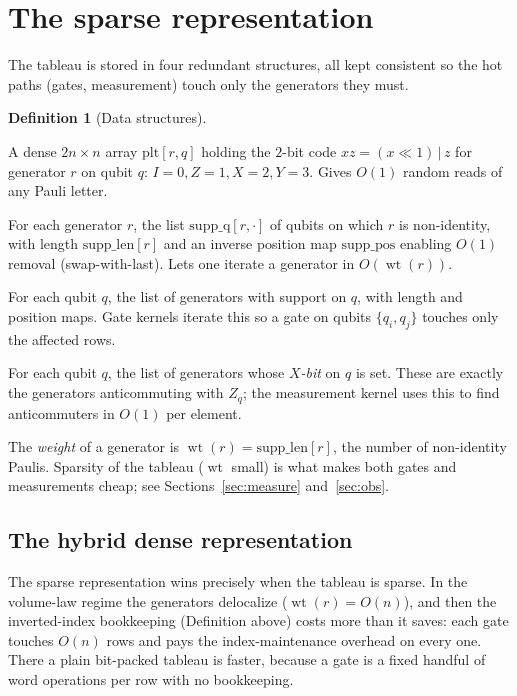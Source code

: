 \documentclass[11pt]{article}
\theoremstyle{definition}
\newtheorem{definition}{Definition}[section]
\theoremstyle{plain}
\newcommand{\wt}{\operatorname{wt}}
\begin{document}
\section{The sparse representation}
\label{sec:sparse}

The tableau is stored in four redundant structures, all kept consistent so the
hot paths (gates, measurement) touch only the generators they must.

\begin{definition}[Data structures]\leavevmode
\begin{description}[leftmargin=1.5em,style=nextline]
\item[PLT (Pauli lookup table)] A dense $2n\times n$ array $\mathrm{plt}[r,q]$
  holding the $2$-bit code $xz=(x\!\ll\!1)\,|\,z$ for generator $r$ on qubit
  $q$: $I{=}0,Z{=}1,X{=}2,Y{=}3$. Gives $O(1)$ random reads of any Pauli letter.
\item[Support lists] For each generator $r$, the list $\mathrm{supp\_q}[r,\cdot]$
  of qubits on which $r$ is non-identity, with length $\mathrm{supp\_len}[r]$ and
  an inverse position map $\mathrm{supp\_pos}$ enabling $O(1)$ removal
  (swap-with-last). Lets one iterate a generator in $O(\wt(r))$.
\item[Inverted index $\mathrm{inv}$] For each qubit $q$, the list of generators
  with support on $q$, with length and position maps. Gate kernels iterate this
  so a gate on qubits $\{q_i,q_j\}$ touches only the affected rows.
\item[Inverted index $\mathrm{inv\_x}$] For each qubit $q$, the list of
  generators whose \emph{$X$-bit} on $q$ is set. These are exactly the
  generators anticommuting with $Z_q$; the measurement kernel uses this to find
  anticommuters in $O(1)$ per element.
\end{description}
\end{definition}
The \emph{weight} of a generator is $\wt(r)=\mathrm{supp\_len}[r]$, the number of
non-identity Paulis. Sparsity of the tableau ($\wt$ small) is what makes both
gates and measurements cheap; see Sections~\ref{sec:measure} and~\ref{sec:obs}.

\subsection{The hybrid dense representation}
\label{sec:hybrid}

The sparse representation wins precisely when the tableau is sparse. In the
volume-law regime the generators delocalize ($\wt(r)=O(n)$), and then the
inverted-index bookkeeping (Definition above) costs more than it saves: each gate
touches $O(n)$ rows and pays the index-maintenance overhead on every one. There a
plain bit-packed tableau is faster, because a gate is a fixed handful of word
operations per row with no bookkeeping.
\end{document}
